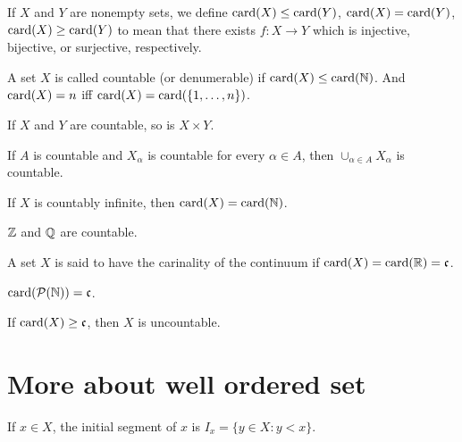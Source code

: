 \begin{definition}
If $X$ and $Y$ are nonempty sets, we define $\mathrm{card} (X) \le \mathrm{card} (Y)$, $\mathrm{card} (X) = \mathrm{card} (Y)$, $\mathrm{card} (X) \ge \mathrm{card} (Y)$ to mean that there exists $f: X \to Y$ which is injective, bijective, or surjective, respectively.
\end{definition}

\begin{definition}
A set $X$ is called countable (or denumerable) if $\mathrm{card} (X) \le \mathrm{card} (\mathbb{N})$.
And $\mathrm{card} (X) = n$ iff $\mathrm{card} (X) = \mathrm{card} (\{ 1, \dots, n \})$.
\end{definition}

\begin{proposition}
If $X$ and $Y$ are countable, so is $X \times Y$.
\end{proposition}

\begin{proposition}
If $A$ is countable and $X_{\alpha}$ is countable for every $\alpha \in A$, then $\cup_{\alpha \in A} X_{\alpha}$ is countable.
\end{proposition}

\begin{proposition}
If $X$ is countably infinite, then $\mathrm{card}(X) = \mathrm{card}(\mathbb{N})$.
\end{proposition}

\begin{proposition}
$\mathbb{Z}$ and $\mathbb{Q}$ are countable.
\end{proposition}

\begin{definition}
A set $X$ is said to have the carinality of the continuum if $\mathrm{card}(X) = \mathrm{card}(\mathbb{R}) = \mathfrak{c}$.
\end{definition}


\begin{proposition}
$\mathrm{card}(\mathcal{P}(\mathbb{N})) = \mathfrak{c}$.
\end{proposition}

\begin{corollary}
If $\mathrm{card}(X) \ge \mathfrak{c}$, then $X$ is uncountable.
\end{corollary}

\section{More about well ordered set}

\begin{definition}
If $x \in X$, the initial segment of $x$ is $I_x = \{ y \in X : y < x \}$.
\end{definition}


